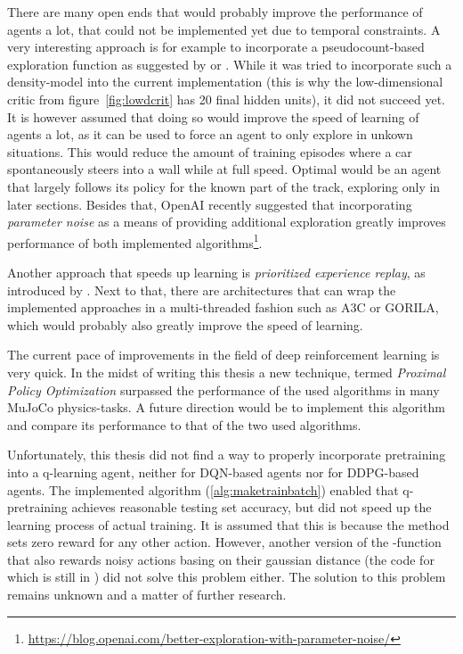 There are many open ends that would probably improve the performance of agents a lot, that could not be implemented yet due to temporal constraints. A very interesting approach is for example to incorporate a pseudocount-based exploration function as suggested by \cite{ostrovski_count-based_2017} or \cite{martin_count-based_2017}. While it was tried to incorporate such a density-model into the current implementation (this is why the low-dimensional critic from figure~\ref{fig:lowdcrit} has 20 final hidden units), it did not succeed yet. It is however assumed that doing so would improve the speed of learning of agents a lot, as it can be used to force an agent to only explore in unkown situations. This would reduce the amount of training episodes where a car spontaneously steers into a wall while at full speed. Optimal would be an agent that largely follows its policy for the known part of the track, exploring only in later sections. Besides that, OpenAI recently suggested that incorporating \textit{parameter noise} as a means of providing additional exploration greatly improves performance of both implemented algorithms\footnote{\url{https://blog.openai.com/better-exploration-with-parameter-noise/}}.

Another approach that speeds up learning is \textit{prioritized experience replay}, as introduced by \cite{schaul_prioritized_2015}. Next to that, there are architectures that can wrap the implemented approaches in a multi-threaded fashion such as  A3C\cite{mnih_asynchronous_2016} or GORILA\cite{nair_massively_2015}, which would probably also greatly improve the speed of learning.

The current pace of improvements in the field of deep reinforcement learning is very quick. In the midst of writing this thesis a new technique, termed \textit{Proximal Policy Optimization} \cite{schulman_proximal_2017} surpassed the performance of the used algorithms in many MuJoCo physics-tasks. A future direction would be to implement this algorithm and compare its performance to that of the two used algorithms.

Unfortunately, this thesis did not find a way to properly incorporate pretraining into a q-learning agent, neither for DQN-based agents nor for DDPG-based agents. The implemented algorithm (\ref{alg:maketrainbatch}) enabled that q-pretraining achieves reasonable testing set accuracy, but did not speed up the learning process of actual training. It is assumed that this is because the method sets zero reward for any other action. However, another version of the -function that also rewards noisy actions basing on their gaussian distance (the code for which is still in ) did not solve this problem either. The solution to this problem remains unknown and a matter of further research.


